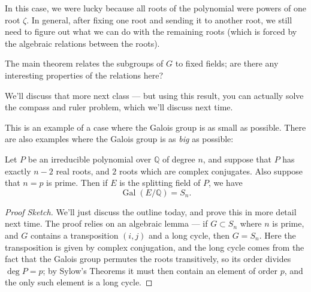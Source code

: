 In this case, we were lucky because all roots of the polynomial were powers of one root $\zeta$. In general, after fixing one root and sending it to another root, we still need to figure out what we can do with the remaining roots (which is forced by the algebraic relations between the roots). 

\begin{question}
The main theorem relates the subgroups of $G$ to fixed fields; are there any interesting properties of the relations here? 
\end{question}

\begin{ans}
We'll discuss that more next class --- but using this result, you can actually solve the compass and ruler problem, which we'll discuss next time. 
\end{ans}

This is an example of a case where the Galois group is as small as possible. There are also examples where the Galois group is as \emph{big} as possible:

\begin{example}
    Let $P$ be an irreducible polynomial over $\mathbb{Q}$ of degree $n$, and suppose that $P$ has exactly $n - 2$ real roots, and $2$ roots which are complex conjugates. Also suppose that $n = p$ is prime. Then if $E$ is the splitting field of $P$, we have \[\operatorname{Gal}(E/\mathbb{Q}) = S_n.\]
\end{example}

\begin{proof}[Proof Sketch]
    We'll just discuss the outline today, and prove this in more detail next time. The proof relies on an algebraic lemma --- if $G \subset S_n$ where $n$ is prime, and $G$ contains a transposition $(i, j)$ and a long cycle, then $G = S_n$. Here the transposition is given by complex conjugation, and the long cycle comes from the fact that the Galois group permutes the roots transitively, so its order divides $\deg P = p$; by Sylow's Theorems it must then contain an element of order $p$, and the only such element is a long cycle. 
\end{proof}



